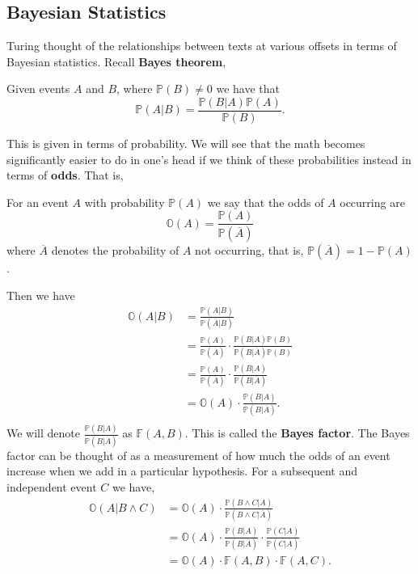   \subsection{Bayesian Statistics}
  Turing thought of the relationships between texts at various
  offsets in terms of Bayesian statistics. Recall {\bf{Bayes theorem}},
  \begin{theorem}
    Given events $A$ and $B$, where $\mathbb{P}(B) \ne 0$ we have that
    \[
      \mathbb{P}(A|B) = \frac{\mathbb{P}(B|A)\mathbb{P}(A)}{\mathbb{P}(B)}.
    \]
  \end{theorem}
  \noindent This is given in terms of probability. We will see that
  the math becomes significantly easier to do in one's head if we
  think of these probabilities instead in terms of {\bf{odds}}. That is,
  \begin{definition}
    For an event $A$ with probability $\mathbb{P}(A)$ we say that the
    odds of $A$ occurring are
    \[
      \mathbb{O}(A) = \frac{\mathbb{P}(A)}{\mathbb{P}(\overline{A})}
    \]
    where $\overline{A}$ denotes the probability of $A$ not occurring,
    that is, $\mathbb{P}(\overline{A}) = 1-\mathbb{P}(A)$.
  \end{definition}
  \noindent Then we have
  \begin{align*}
    \mathbb{O}(A|B) & =
    \frac{\mathbb{P}(A|B)}{\mathbb{P}(\overline{A}|B)}
    \\
    & =
    \frac{\mathbb{P}(A)}{\mathbb{P}(\overline{A})}\cdot\frac{\mathbb{P}(B|A)\mathbb{P}(B)}{\mathbb{P}(B|\overline{A})\mathbb{P}(B)}
    \\
    & =
    \frac{\mathbb{P}(A)}{\mathbb{P}(\overline{A})}\cdot\frac{\mathbb{P}(B|A)}{\mathbb{P}(B|\overline{A})}
    \\
    & =
    \mathbb{O}(A)\cdot\frac{\mathbb{P}(B|A)}{\mathbb{P}(B|\overline{A})}.
    \\
  \end{align*}
  \noindent We will denote
  $\frac{\mathbb{P}(B|A)}{\mathbb{P}(B|\overline{A})}$ as
  $\mathbb{F}(A,B)$. This is called the {\bf{Bayes factor}}. The
  Bayes factor can be thought of as a measurement of how much the
  odds of an event increase when we add in a particular hypothesis.
  For a subsequent and independent event $C$ we have,
  \begin{align*}
    \mathbb{O}(A|B\wedge C) & =
    \mathbb{O}(A)\cdot\frac{\mathbb{P}(B\wedge C|
    A)}{\mathbb{P}(B\wedge C| \overline{A})}
    \\
    & = \mathbb{O}(A)\cdot\frac{\mathbb{P}(B| A)}{\mathbb{P}(B|
    \overline{A})}\cdot\frac{\mathbb{P}(C|A)}{\mathbb{P}(C|\overline{A})}
    \\
    & = \mathbb{O}(A)\cdot \mathbb{F}(A,B) \cdot \mathbb{F}(A,C).
  \end{align*}
